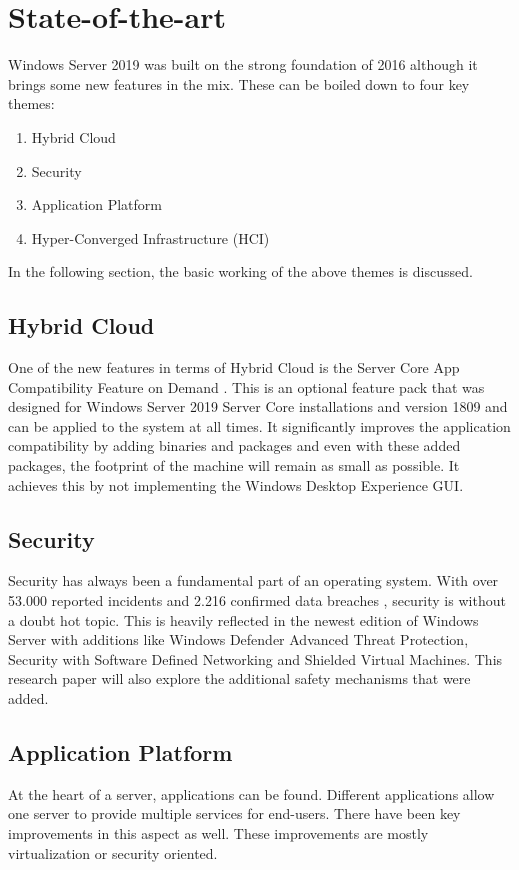 \section{State-of-the-art}\label{sec:state-of-the-art}
Windows Server 2019 was built on the strong foundation of 2016 although it brings some new features \autocite{Gerend2018} in the mix. 
These can be boiled down to four key themes:
\begin{enumerate}
	\item Hybrid Cloud
	\item Security
	\item Application Platform
	\item Hyper-Converged Infrastructure (HCI)
\end{enumerate}
In the following section, the basic working of the above themes is discussed.
\subsection{Hybrid Cloud}
One of the new features in terms of Hybrid Cloud is the Server Core App Compatibility Feature on Demand \autocite{Pacquer2018}. This is an optional feature pack that was designed for Windows Server 2019 Server Core installations and version 1809 and can be applied to the system at all times. 
It significantly improves the application compatibility by adding binaries and packages and even with these added packages, the footprint of the machine will remain as small as possible. It achieves this by not implementing the Windows Desktop Experience GUI.
\subsection{Security}
Security has always been a fundamental part of an operating system. With over 53.000 reported incidents and 2.216 confirmed data breaches \autocite{Verizon2018}, security is without a doubt hot topic. This is heavily reflected in the newest edition of Windows Server with additions like Windows Defender Advanced Threat Protection, Security with Software Defined Networking and Shielded Virtual Machines. This research paper will also explore the additional safety mechanisms that were added.
\subsection{Application Platform}
At the heart of a server, applications can be found. Different applications allow one server to provide multiple services for end-users. There have been key improvements in this aspect as well. These improvements are mostly virtualization or security oriented. 
